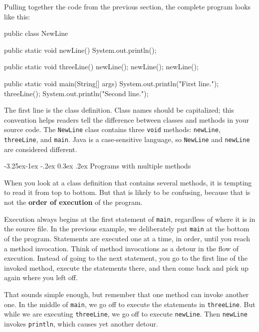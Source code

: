 \documentclass[12pt]{book}
\makeatletter
\renewcommand\subsection{\@startsection{subsection}{2}{\z@}%
    {-3.25ex\@plus -1ex \@minus -.2ex}%
    {0.3ex \@plus .2ex}%
    {\normalfont\large\bfseries}}
\theoremstyle{exercise}
\newcommand{\java}[1]{\lstinline{#1}} %
\makeatother
\begin{document}
Pulling together the code from the previous section, the complete program looks like this:

\begin{code}
public class NewLine {

    public static void newLine() {
        System.out.println();
    }

    public static void threeLine() {
        newLine();
        newLine();
        newLine();
    }

    public static void main(String[] args) {
        System.out.println("First line.");
        threeLine();
        System.out.println("Second line.");
    }
}
\end{code}


The first line is the class definition.
Class names should be capitalized; this convention helps readers tell the difference between classes and methods in your source code.
The \java{NewLine} class contains three \java{void} methods: \java{newLine}, \java{threeLine}, and \java{main}.
Java is a case-sensitive language, so \java{NewLine} and \java{newLine} are considered different.

\subsection{Programs with multiple methods}


When you look at a class definition that contains several methods, it is tempting to read it from top to bottom.
But that is likely to be confusing, because that is not the {\bf order of execution} of the program.

Execution always begins at the first statement of \java{main}, regardless of where it is in the source file.
In the previous example, we deliberately put \java{main} at the bottom of the program.
Statements are executed one at a time, in order, until you reach a method invocation.
Think of method invocations as a detour in the flow of execution.
Instead of going to the next statement, you go to the first line of the invoked method, execute the statements there, and then come back and pick up again where you left off.

That sounds simple enough, but remember that one method can invoke another one.
In the middle of \java{main}, we go off to execute the statements in \java{threeLine}.
But while we are executing \java{threeLine}, we go off to execute \java{newLine}.
Then \java{newLine} invokes \java{println}, which causes yet another detour.
\end{document}
